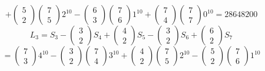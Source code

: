 \documentclass{article}
\begin{document}
$$
+
\left(\begin{array}{c}
5\\
2
\end{array}\right)
\left(\begin{array}{c}
7\\
5
\end{array}\right)
2^{10}
-
\left(\begin{array}{c}
6\\
3
\end{array}\right)
\left(\begin{array}{c}
7\\
6
\end{array}\right)
1^{10}
+
\left(\begin{array}{c}
7\\
4
\end{array}\right)
\left(\begin{array}{c}
7\\
7
\end{array}\right)
0^{10}
=
28648200
$$
$$
L_3=S_3-
\left(\begin{array}{c}
3\\
2
\end{array}\right)
S_4
+
\left(\begin{array}{c}
4\\
2
\end{array}\right)
S_5
-
\left(\begin{array}{c}
3\\
2
\end{array}\right)
S_6
+
\left(\begin{array}{c}
6\\
2
\end{array}\right)
S_7
$$
$$
=\left(\begin{array}{c}
7\\
3
\end{array}\right)
4^{10}
-
\left(\begin{array}{c}
3\\
2
\end{array}\right)
\left(\begin{array}{c}
7\\
4
\end{array}\right)
3^{10}
+
\left(\begin{array}{c}
4\\
2
\end{array}\right)
\left(\begin{array}{c}
7\\
5
\end{array}\right)
2^{10}
-
\left(\begin{array}{c}
5\\
2
\end{array}\right)
\left(\begin{array}{c}
7\\
6
\end{array}\right)
1^{10}
$$
\end{document}
